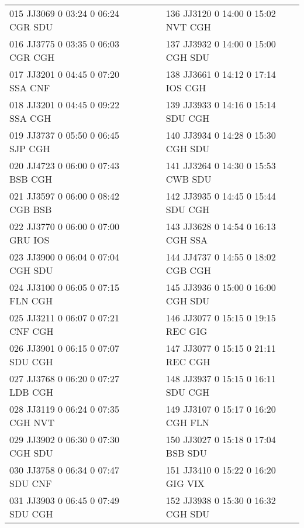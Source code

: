 \begin{scriptsize}
\begin{longtable}{l c c l}
015 JJ3069 0 03:24 0 06:24 CGR SDU & & & 136 JJ3120 0 14:00 0 15:02 NVT CGH \\

016 JJ3775 0 03:35 0 06:03 CGR CGH & & & 137 JJ3932 0 14:00 0 15:00 CGH SDU \\

017 JJ3201 0 04:45 0 07:20 SSA CNF & & & 138 JJ3661 0 14:12 0 17:14 IOS CGH \\

018 JJ3201 0 04:45 0 09:22 SSA CGH & & & 139 JJ3933 0 14:16 0 15:14 SDU CGH \\

019 JJ3737 0 05:50 0 06:45 SJP CGH & & & 140 JJ3934 0 14:28 0 15:30 CGH SDU \\

020 JJ4723 0 06:00 0 07:43 BSB CGH & & & 141 JJ3264 0 14:30 0 15:53 CWB SDU \\

021 JJ3597 0 06:00 0 08:42 CGB BSB & & & 142 JJ3935 0 14:45 0 15:44 SDU CGH \\

022 JJ3770 0 06:00 0 07:00 GRU IOS & & & 143 JJ3628 0 14:54 0 16:13 CGH SSA \\

023 JJ3900 0 06:04 0 07:04 CGH SDU & & & 144 JJ4737 0 14:55 0 18:02 CGB CGH \\

024 JJ3100 0 06:05 0 07:15 FLN CGH & & & 145 JJ3936 0 15:00 0 16:00 CGH SDU \\

025 JJ3211 0 06:07 0 07:21 CNF CGH & & & 146 JJ3077 0 15:15 0 19:15 REC GIG \\

026 JJ3901 0 06:15 0 07:07 SDU CGH & & & 147 JJ3077 0 15:15 0 21:11 REC CGH \\

027 JJ3768 0 06:20 0 07:27 LDB CGH & & & 148 JJ3937 0 15:15 0 16:11 SDU CGH \\

028 JJ3119 0 06:24 0 07:35 CGH NVT & & & 149 JJ3107 0 15:17 0 16:20 CGH FLN \\

029 JJ3902 0 06:30 0 07:30 CGH SDU & & & 150 JJ3027 0 15:18 0 17:04 BSB SDU \\

030 JJ3758 0 06:34 0 07:47 SDU CNF & & & 151 JJ3410 0 15:22 0 16:20 GIG VIX \\

031 JJ3903 0 06:45 0 07:49 SDU CGH & & & 152 JJ3938 0 15:30 0 16:32 CGH SDU \\


\end{longtable}
\end{scriptsize}
